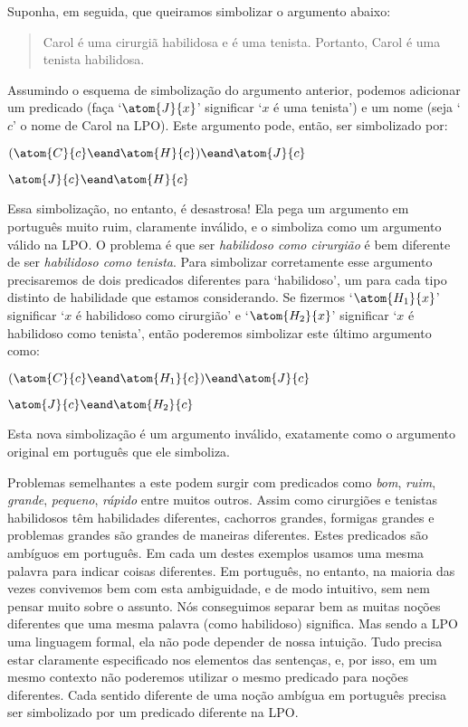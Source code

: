 Suponha, em seguida, que queiramos simbolizar o argumento abaixo:
\begin{quote}
\label{surgeon3}
Carol é uma cirurgiã habilidosa e é uma tenista. Portanto, Carol é uma tenista habilidosa.
\end{quote}
Assumindo o esquema de simbolização do argumento anterior, podemos adicionar um predicado (faça `$\atom{J}{x}$' significar `$x$ é uma tenista') e um nome (seja `$c$' o nome de Carol na LPO).
Este argumento pode, então, ser simbolizado por:
\begin{earg}
\item[] $(\atom{C}{c} \eand \atom{H}{c}) \eand \atom{J}{c}$
\item[\therefore] $\atom{J}{c} \eand \atom{H}{c}$
\end{earg}
Essa simbolização, no entanto, é desastrosa!
Ela pega um argumento em português muito ruim, claramente inválido, e o simboliza como um argumento válido na LPO.
O problema é que ser \emph{habilidoso como cirurgião} é bem diferente de ser \emph{habilidoso como tenista}.
Para simbolizar corretamente esse argumento precisaremos de dois predicados diferentes para `habilidoso', um para cada tipo distinto de habilidade que estamos considerando.
Se fizermos `$\atom{H_1}{x}$' significar `$x$ é habilidoso como cirurgião' e `$\atom{H_2}{x}$' significar `$x$ é habilidoso como tenista', então poderemos simbolizar este último argumento como:
\begin{earg}
\label{surgeon3correct}
\item[] $(\atom{C}{c} \eand \atom{H_1}{c}) \eand \atom{J}{c}$
\item[\therefore] $\atom{J}{c} \eand \atom{H_2}{c}$
\end{earg}
Esta nova simbolização é um argumento inválido, exatamente como o argumento original em português que ele simboliza.

Problemas semelhantes a este podem surgir com predicados como \emph{bom}, \emph{ruim}, \emph{grande}, \emph{pequeno}, \emph{rápido} entre muitos outros.
Assim como cirurgiões e tenistas habilidosos têm habilidades diferentes, cachorros grandes, formigas grandes e problemas grandes são grandes de maneiras diferentes.
Estes predicados são ambíguos em português.
Em cada um destes exemplos usamos uma mesma palavra para indicar coisas diferentes.
Em português, no entanto, na maioria das vezes convivemos bem com esta ambiguidade, e de modo intuitivo, sem nem pensar muito sobre o assunto.
Nós conseguimos separar bem as muitas noções diferentes que uma mesma palavra (como habilidoso) significa.
Mas sendo a LPO uma linguagem formal, ela não pode depender de nossa intuição.
Tudo precisa estar claramente especificado nos elementos das sentenças, e, por isso, em um mesmo contexto não poderemos utilizar o mesmo predicado para noções diferentes.
Cada sentido diferente de uma noção ambígua em português precisa ser simbolizado por um predicado diferente na LPO.

